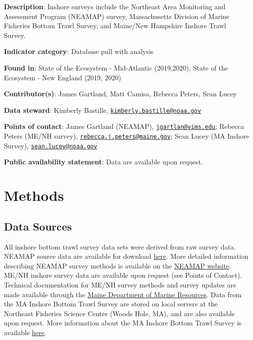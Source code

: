 \documentclass[
]{book}
\begin{document}
\textbf{Description}: Inshore surveys include the Northeast Area Monitoring and Assessment Program (NEAMAP) survey, Massachusetts Division of Marine Fisheries Bottom Trawl Survey, and Maine/New Hampshire Inshore Trawl Survey.

\textbf{Indicator category}: Database pull with analysis

\textbf{Found in}: State of the Ecosystem - Mid-Atlantic (2019,2020), State of the Ecosystem - New England (2019, 2020)

\textbf{Contributor(s)}: James Gartland, Matt Camisa, Rebecca Peters, Sean Lucey

\textbf{Data steward}: Kimberly Bastille, \href{mailto:kimberly.bastille@noaa.gov}{\nolinkurl{kimberly.bastille@noaa.gov}}

\textbf{Points of contact}: James Gartland (NEAMAP), \href{mailto:jgartlan@vims.edu}{\nolinkurl{jgartlan@vims.edu}}; Rebecca Peters (ME/NH survey), \href{mailto:rebecca.j.peters@maine.gov}{\nolinkurl{rebecca.j.peters@maine.gov}}; Sean Lucey (MA Inshore Survey), \href{mailto:sean.lucey@noaa.gov}{\nolinkurl{sean.lucey@noaa.gov}}

\textbf{Public availability statement}: Data are available upon request.

\hypertarget{methods-21}{%
\section{Methods}\label{methods-21}}

\hypertarget{data-sources-21}{%
\subsection{Data Sources}\label{data-sources-21}}

All inshore bottom trawl survey data sets were derived from raw survey data. NEAMAP source data are available for download \href{https://www.vims.edu/research/departments/fisheries/programs/multispecies_fisheries_research/abundance_indices/index.php}{here}. More detailed information describing NEAMAP survey methods is available on the \href{http://neamap.net}{NEAMAP website}. ME/NH inshore survey data are available upon request (see Points of Contact). Technical documentation for ME/NH survey methods and survey updates are made available through the \href{https://www.maine.gov/dmr/science-research/projects/trawlsurvey/index.html}{Maine Department of Marine Resources}. Data from the MA Inshore Bottom Trawl Survey are stored on local servers at the Northeast Fisheries Science Center (Woods Hole, MA), and are also available upon request. More information about the MA Inshore Bottom Trawl Survey is available \href{https://www.mass.gov/service-details/review-trawl-survey-updates}{here}.
\end{document}
